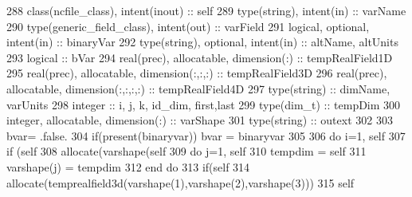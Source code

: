 \begin{DoxyCode}
288     \textcolor{keywordtype}{class}(ncfile\_class), \textcolor{keywordtype}{intent(inout)} :: self
289     \textcolor{keywordtype}{type}(string), \textcolor{keywordtype}{intent(in)} :: varName
290     \textcolor{keywordtype}{type}(generic\_field\_class), \textcolor{keywordtype}{intent(out)} :: varField
291     \textcolor{keywordtype}{logical}, \textcolor{keywordtype}{optional}, \textcolor{keywordtype}{intent(in)} :: binaryVar
292     \textcolor{keywordtype}{type}(string), \textcolor{keywordtype}{optional}, \textcolor{keywordtype}{intent(in)} :: altName, altUnits
293     \textcolor{keywordtype}{logical} :: bVar
294     \textcolor{keywordtype}{real(prec)}, \textcolor{keywordtype}{allocatable}, \textcolor{keywordtype}{dimension(:)} :: tempRealField1D
295     \textcolor{keywordtype}{real(prec)}, \textcolor{keywordtype}{allocatable}, \textcolor{keywordtype}{dimension(:,:,:)} :: tempRealField3D
296     \textcolor{keywordtype}{real(prec)}, \textcolor{keywordtype}{allocatable}, \textcolor{keywordtype}{dimension(:,:,:,:)} :: tempRealField4D
297     \textcolor{keywordtype}{type}(string) :: dimName, varUnits
298     \textcolor{keywordtype}{integer} :: i, j, k, id\_dim, first,last
299     \textcolor{keywordtype}{type}(dim\_t) :: tempDim
300     \textcolor{keywordtype}{integer}, \textcolor{keywordtype}{allocatable}, \textcolor{keywordtype}{dimension(:)} :: varShape
301     \textcolor{keywordtype}{type}(string) :: outext
302 
303     bvar= .false.
304     \textcolor{keywordflow}{if}(\textcolor{keyword}{present}(binaryvar)) bvar = binaryvar
305 
306     \textcolor{keywordflow}{do} i=1, self%
307         \textcolor{keywordflow}{if} (self%
308             \textcolor{keyword}{allocate}(varshape(self%
309             \textcolor{keywordflow}{do} j=1, self%
310                 tempdim = self%
311                 varshape(j) = tempdim%
312 \textcolor{keywordflow}{            end do}
313             \textcolor{keywordflow}{if}(self%
314                 \textcolor{keyword}{allocate}(temprealfield3d(varshape(1),varshape(2),varshape(3)))
315                 self%

\end{DoxyCode}
